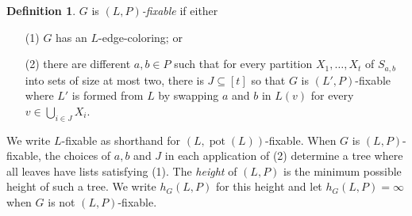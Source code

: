 \documentclass[12pt]{article}
\theoremstyle{plain}
\theoremstyle{definition}
\newtheorem{defn}{Definition}
\theoremstyle{remark}
\newcommand{\irange}[1]{\left[#1\right]}
\newcommand{\pot}{\operatorname{pot}}
\begin{document}
\begin{defn}
$G$ is \emph{$(L, P)$-fixable} if either
\begin{enumerate}
\item[(1)] $G$ has an $L$-edge-coloring; or
\item[(2)] there are different $a,b \in P$ such that for every partition $X_1, \ldots, X_t$ of $S_{a,b}$ into sets of size at most two, 
      there is $J \subseteq \irange{t}$ so that $G$ is $(L', P)$-fixable where $L'$ is formed from $L$ by swapping $a$ and $b$ in $L(v)$ for every $v \in \bigcup_{i \in J} X_i$.
\end{enumerate}
\end{defn}

We write $L$-fixable as shorthand for $(L, \pot(L))$-fixable. When $G$ is $(L, P)$-fixable, the choices of $a,b$ and $J$ in each application of (2) determine a tree where all leaves have lists satisfying (1).  The \emph{height} of $(L, P)$ is the minimum possible height of such a tree.  We write $h_G(L, P)$ for this height and let $h_G(L, P) = \infty$ when $G$ is not $(L,P)$-fixable. 
\end{document}
